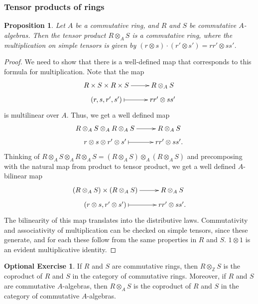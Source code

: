\documentclass{amsart}[12pt]
\newcommand{\Z}{\mathbb{Z}}
\numberwithin{equation}{section}
\theoremstyle{plain} %
\newtheorem{prop}[equation]{Proposition}
\theoremstyle{definition}
\newtheorem{exer}[equation]{Optional Exercise}
\theoremstyle{remark}
\newcommand{\sssec}[1]{\subsubsection{#1}}
\begin{document}
\sssec{Tensor products of rings}

\begin{prop}
Let $A$ be a commutative ring, and $R$ and $S$ be commutative $A$-algebras. Then the tensor product $R\otimes_A S$ is a commutative ring, where the multiplication on simple tensors is given by $(r\otimes s) \cdot (r'\otimes s') = rr' \otimes ss'$.
\end{prop}
\begin{proof}
We need to show that there is a well-defined map that corresponds to this formula for multiplication. Note that the map \[ \xymatrix@R=.5em{R\times S \times R \times S \ar[r] & R\otimes_A S\\
(r,s,r',s') \ar@{|->}[r] & rr' \otimes ss'}\]
is multilinear over $A$. Thus, we get a well defined map
\[ \xymatrix@R=.5em{R\otimes_A S \otimes_A R \otimes_A S \ar[r] & R\otimes_A S\\
r\otimes s \otimes r' \otimes s' \ar@{|->}[r] & rr' \otimes ss'.}\]
Thinking of $R\otimes_A S \otimes_A R \otimes_A S = (R\otimes_A S) \otimes_A (R \otimes_A S)$ and precomposing with the natural map from product to tensor product, we get 
a well defined $A$-bilinear map
\[ \xymatrix@R=.5em{(R\otimes_A S) \times (R \otimes_A S) \ar[r] & R\otimes_A S\\
(r\otimes s , r' \otimes s') \ar@{|->}[r] & rr' \otimes ss'.}\]
The bilinearity of this map translates into the distributive laws. Commutativity and associativity of multiplication can be checked on simple tensors, since these generate, and for each these follow from the same properties in $R$ and $S$. $1\otimes 1$ is an evident multiplicative identity.
\end{proof}

\begin{exer} If $R$ and $S$ are commutative rings, then $R\otimes_{\Z} S$ is the coproduct of $R$ and $S$ in the category of commutative rings. Moreover, if $R$ and $S$ are commutative $A$-algebras, then $R\otimes_A S$ is the coproduct of $R$ and $S$ in the category of commutative $A$-algebras.
\end{exer}
\end{document}
